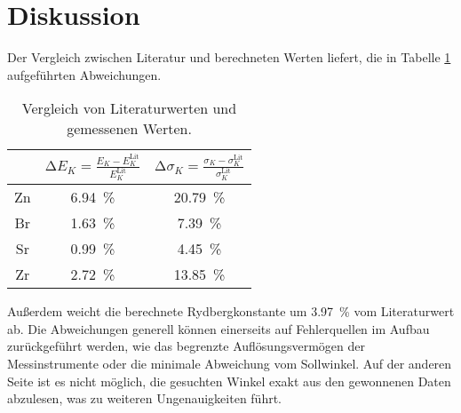 \section{Diskussion}
\label{sec:Diskussion}

Der Vergleich zwischen Literatur und berechneten Werten liefert, die in Tabelle \ref{tab:abw} aufgeführten Abweichungen.
\begin{table}
  \centering
  \caption{Vergleich von Literaturwerten und gemessenen Werten.}
  \label{tab:abw}
  \begin{tabular}{c c c}
    \toprule
    & $\increment E_K = \frac{E_K - E^\text{Lit}_K}{E^\text{Lit}_K}$ & $\increment \sigma_K = \frac{\sigma_K - \sigma^\text{Lit}_K}{\sigma^\text{Lit}_K}$ \\
    \midrule
    Zn & \SI{6.94}{\percent} & \SI{20.79}{\percent} \\
    Br & \SI{1.63}{\percent} & \SI{7.39}{\percent} \\
    Sr & \SI{0.99}{\percent} & \SI{4.45}{\percent} \\
    Zr & \SI{2.72}{\percent} & \SI{13.85}{\percent} \\
    \bottomrule
  \end{tabular}
\end{table}
Außerdem weicht die berechnete Rydbergkonstante um \SI{3.97}{\percent} vom Literaturwert ab.
Die Abweichungen generell können einerseits auf Fehlerquellen im Aufbau zurückgeführt werden,
wie das begrenzte Auflösungsvermögen der Messinstrumente oder die minimale Abweichung vom Sollwinkel.
Auf der anderen Seite ist es nicht möglich, die gesuchten Winkel exakt aus den gewonnenen Daten abzulesen,
was zu weiteren Ungenauigkeiten führt.
